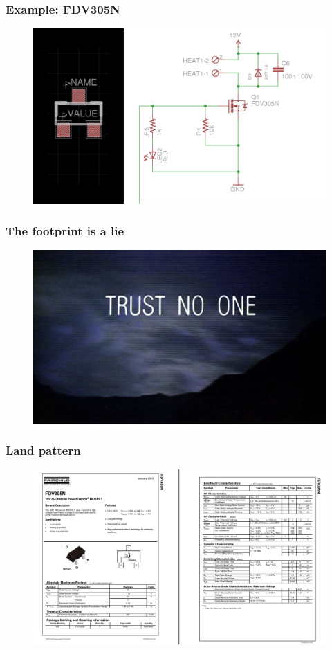 \documentclass{beamer}
\begin{document}
\begin{frame}
\frametitle{Example: FDV305N}
\begin{figure}
\includegraphics[width=1.0\linewidth]{fdv30n.png}
\end{figure}
\end{frame}


\begin{frame}
\frametitle{The footprint is a lie}
\begin{figure}
\includegraphics[width=0.8\linewidth]{trustnoone.jpg}
\end{figure}
\end{frame}


\begin{frame}
\frametitle{Land pattern}
\begin{figure}
\includegraphics[width=1\linewidth]{datasheet.png}
\end{figure}
\end{frame}
\end{document}
